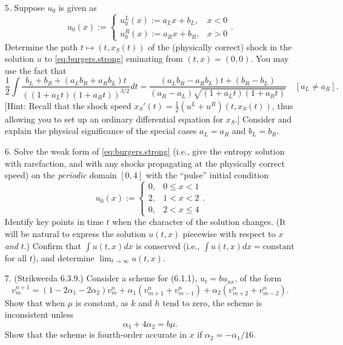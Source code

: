 \documentclass{article}
\begin{document}
\begin{itemize}
\item[5.] Suppose $u_0$ is given as
\begin{equation*}
u_0(x) := \begin{cases} u^L_0(x) := a_L x + b_L, & x < 0 \\ u^R_0(x) := a_R x + b_R, & x > 0 \end{cases}.
\end{equation*}
Determine the path $t \mapsto \left( t, x_S(t) \right)$ of the (physically correct) shock in the solution $u$ to \eqref{eq:burgers.strong} eminating from $(t,x) = (0,0)$. You may use the fact that
\begin{equation*}
\frac{1}{2} \int \frac{b_L + b_R + \left( a_L b_R + a_R b_L \right) t}{\left( \left( 1 + a_L t \right) \left( 1 + a_R t \right) \right)^{3/2}} dt = \frac{\left( a_L b_R - a_R b_L \right) t + \left( b_R - b_L \right)}{\left( a_R - a_L \right) \sqrt{\left( 1 + a_L t \right) \left( 1 + a_R t \right)}} \quad \left[ a_L \neq a_R \right].
\end{equation*}
[Hint: Recall that the shock speed $x_S'(t) = \frac{1}{2} \left( u^L + u^R \right) \left( t, x_S(t) \right)$, thus allowing you to set up an ordinary differential equation for $x_S$.] Consider and explain the physical significance of the special cases $a_L = a_R$ and $b_L = b_R$.

\item[6.] Solve the weak form of \eqref{eq:burgers.strong} (i.e., give the entropy solution with rarefaction, and with any shocks propagating at the physically correct speed) on the \emph{periodic} domain $[0,4]$ with the ``pulse'' initial condition
\begin{equation}\label{eq:pulse}
u_0(x) := \begin{cases} 0, & 0 \leq x < 1 \\ 2, & 1 < x < 2 \\ 0, & 2 < x \leq 4 \end{cases}.
\end{equation}
Identify key points in time $t$ when the character of the solution changes. (It will be natural to express the solution $u(t,x)$ piecewise with respect to $x$ \emph{and} $t$.) Confirm that $\int u(t,x) dx$ is conserved (i.e., $\int u(t,x) dx = \text{constant}$ for all $t$), and determine $\lim_{t \to \infty} u(t,x)$.

\item[7.] (Strikwerda 6.3.9.) Consider a scheme for (6.1.1), $u_t = b u_{xx}$, of the form
\begin{equation*}
v^{n+1}_m = \left( 1 - 2 \alpha_1 - 2 \alpha_2 \right) v^n_m + \alpha_1 \left( v^n_{m+1} + v^n_{m-1} \right) + \alpha_2 \left( v^n_{m+2} + v^n_{m-2} \right).
\end{equation*}
Show that when $\mu$ is constant, as $k$ and $h$ tend to zero, the scheme is inconsistent unless
\begin{equation*}
\alpha_1 + 4 \alpha_2 = b \mu.
\end{equation*}
Show that the scheme is fourth-order accurate in $x$ if $\alpha_2 = -\alpha_1 / 16$.

\end{itemize}
\end{document}
